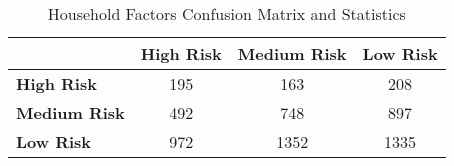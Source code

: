 \begin{table}[!htbp]
    \small
    \centering
    \caption{Household Factors Confusion Matrix and Statistics}
    \label{tab:waid_confusion}
    \begin{tabular}{lccc}
        \toprule
        & \textbf{High Risk} & \textbf{Medium Risk} & \textbf{Low Risk} \\
        \midrule
        \textbf{High Risk} & 195 & 163 & 208 \\
        \textbf{Medium Risk} & 492 & 748 & 897 \\
        \textbf{Low Risk} & 972 & 1352 & 1335 \\
        \bottomrule
    \end{tabular}
\end{table}